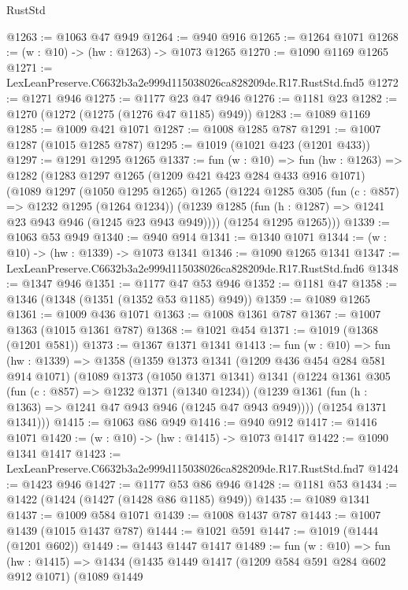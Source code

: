 \begin{lexlean}{RustStd}
\begin{coremodule}
@1263 := @1063 @47 @949
@1264 := @940 @916
@1265 := @1264 @1071
@1268 := (w : @10) -> (hw : @1263) -> @1073 @1265
@1270 := @1090 @1169 @1265
@1271 := LexLeanPreserve.C6632b3a2e999d115038026ca828209de.R17.RustStd.fnd5
@1272 := @1271 @946
@1275 := @1177 @23 @47 @946
@1276 := @1181 @23
@1282 := @1270 (@1272 (@1275 (@1276 @47 @1185) @949))
@1283 := @1089 @1169
@1285 := @1009 @421 @1071
@1287 := @1008 @1285 @787
@1291 := @1007 @1287 (@1015 @1285 @787)
@1295 := @1019 (@1021 @423 (@1201 @433))
@1297 := @1291 @1295 @1265
@1337 := fun (w : @10) =>
  fun (hw : @1263) =>
  @1282
    (@1283
      @1297
      @1265
      (@1209 @421 @423 @284 @433 @916 @1071)
      (@1089
        @1297
        (@1050 @1295 @1265)
        @1265
        (@1224
          @1285
          @305
          (fun (c : @857) => @1232 @1295 (@1264 @1234))
          (@1239 @1285 (fun (h : @1287) => @1241 @23 @943 @946 (@1245 @23 @943 @949))))
        (@1254 @1295 @1265)))
@1339 := @1063 @53 @949
@1340 := @940 @914
@1341 := @1340 @1071
@1344 := (w : @10) -> (hw : @1339) -> @1073 @1341
@1346 := @1090 @1265 @1341
@1347 := LexLeanPreserve.C6632b3a2e999d115038026ca828209de.R17.RustStd.fnd6
@1348 := @1347 @946
@1351 := @1177 @47 @53 @946
@1352 := @1181 @47
@1358 := @1346 (@1348 (@1351 (@1352 @53 @1185) @949))
@1359 := @1089 @1265
@1361 := @1009 @436 @1071
@1363 := @1008 @1361 @787
@1367 := @1007 @1363 (@1015 @1361 @787)
@1368 := @1021 @454
@1371 := @1019 (@1368 (@1201 @581))
@1373 := @1367 @1371 @1341
@1413 := fun (w : @10) =>
  fun (hw : @1339) =>
  @1358
    (@1359
      @1373
      @1341
      (@1209 @436 @454 @284 @581 @914 @1071)
      (@1089
        @1373
        (@1050 @1371 @1341)
        @1341
        (@1224
          @1361
          @305
          (fun (c : @857) => @1232 @1371 (@1340 @1234))
          (@1239 @1361 (fun (h : @1363) => @1241 @47 @943 @946 (@1245 @47 @943 @949))))
        (@1254 @1371 @1341)))
@1415 := @1063 @86 @949
@1416 := @940 @912
@1417 := @1416 @1071
@1420 := (w : @10) -> (hw : @1415) -> @1073 @1417
@1422 := @1090 @1341 @1417
@1423 := LexLeanPreserve.C6632b3a2e999d115038026ca828209de.R17.RustStd.fnd7
@1424 := @1423 @946
@1427 := @1177 @53 @86 @946
@1428 := @1181 @53
@1434 := @1422 (@1424 (@1427 (@1428 @86 @1185) @949))
@1435 := @1089 @1341
@1437 := @1009 @584 @1071
@1439 := @1008 @1437 @787
@1443 := @1007 @1439 (@1015 @1437 @787)
@1444 := @1021 @591
@1447 := @1019 (@1444 (@1201 @602))
@1449 := @1443 @1447 @1417
@1489 := fun (w : @10) =>
  fun (hw : @1415) =>
  @1434
    (@1435
      @1449
      @1417
      (@1209 @584 @591 @284 @602 @912 @1071)
      (@1089
        @1449

\end{coremodule}
\end{lexlean}
